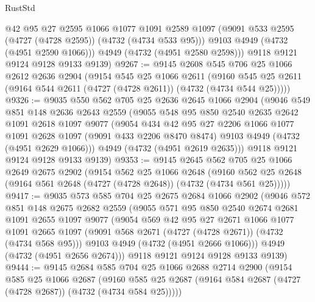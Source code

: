 \begin{lexlean}{RustStd}
\begin{coremodule}
{\begin{coremodule}
{{{{{{{{{{{{{{          @42
          @95
          @27
          @2595
          @1066
          @1077
          @1091
          @2589
          @1097
          (@9091 @533 @2595 (@4727 (@4728 @2595)) (@4732 (@4734 @533 @95)))
          @9103
          @4949
          (@4732 (@4951 @2590 @1066)))
        @4949
        (@4732 (@4951 @2580 @2598)))
      @9118
      @9121
      @9124
      @9128
      @9133
      @9139)
@9267 := @9145
    @2608
    @545
    @706
    @25
    @1066
    @2612
    @2636
    @2904
    (@9154
      @545
      @25
      @1066
      @2611
      (@9160 @545 @25 @2611 (@9164 @544 @2611 (@4727 (@4728 @2611)) (@4732 (@4734 @544 @25)))))
@9326 := @9035
    @550
    @562
    @705
    @25
    @2636
    @2645
    @1066
    @2904
    (@9046
      @549
      @851
      @148
      @2636
      @2643
      @2559
      (@9055
        @548
        @95
        @850
        @2540
        @2635
        @2642
        @1091
        @2618
        @1097
        @9077
        (@9054
          @434
          @42
          @95
          @27
          @2206
          @1066
          @1077
          @1091
          @2628
          @1097
          (@9091 @433 @2206 @8470 @8474)
          @9103
          @4949
          (@4732 (@4951 @2629 @1066)))
        @4949
        (@4732 (@4951 @2619 @2635)))
      @9118
      @9121
      @9124
      @9128
      @9133
      @9139)
@9353 := @9145
    @2645
    @562
    @705
    @25
    @1066
    @2649
    @2675
    @2902
    (@9154
      @562
      @25
      @1066
      @2648
      (@9160 @562 @25 @2648 (@9164 @561 @2648 (@4727 (@4728 @2648)) (@4732 (@4734 @561 @25)))))
@9417 := @9035
    @573
    @585
    @704
    @25
    @2675
    @2684
    @1066
    @2902
    (@9046
      @572
      @851
      @148
      @2675
      @2682
      @2559
      (@9055
        @571
        @95
        @850
        @2540
        @2674
        @2681
        @1091
        @2655
        @1097
        @9077
        (@9054
          @569
          @42
          @95
          @27
          @2671
          @1066
          @1077
          @1091
          @2665
          @1097
          (@9091 @568 @2671 (@4727 (@4728 @2671)) (@4732 (@4734 @568 @95)))
          @9103
          @4949
          (@4732 (@4951 @2666 @1066)))
        @4949
        (@4732 (@4951 @2656 @2674)))
      @9118
      @9121
      @9124
      @9128
      @9133
      @9139)
@9444 := @9145
    @2684
    @585
    @704
    @25
    @1066
    @2688
    @2714
    @2900
    (@9154
      @585
      @25
      @1066
      @2687
      (@9160 @585 @25 @2687 (@9164 @584 @2687 (@4727 (@4728 @2687)) (@4732 (@4734 @584 @25)))))
}}}}}}}}}}}}}}
\end{coremodule}}
\end{coremodule}
\end{lexlean}
